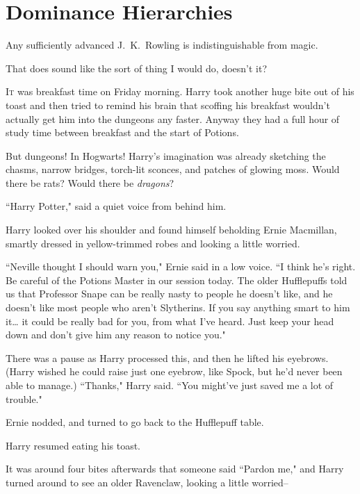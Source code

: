 \chapter{Dominance Hierarchies}

\begin{chapterOpeningAuthorNote}
Any sufficiently advanced J.~K.~Rowling is indistinguishable from magic.
\end{chapterOpeningAuthorNote}
\begin{chapterOpeningQuote}
That does sound like the sort of thing I would do, doesn't it?
\end{chapterOpeningQuote}

\lettrine{I}{t} was breakfast time on Friday morning. Harry took another huge bite out of his toast and then tried to remind his brain that scoffing his breakfast wouldn't actually get him into the dungeons any faster. Anyway they had a full hour of study time between breakfast and the start of Potions.

But dungeons! In Hogwarts! Harry's imagination was already sketching the chasms, narrow bridges, torch-lit sconces, and patches of glowing moss. Would there be rats? Would there be \emph{dragons}?

``Harry Potter," said a quiet voice from behind him.

Harry looked over his shoulder and found himself beholding Ernie Macmillan, smartly dressed in yellow-trimmed robes and looking a little worried.

``Neville thought I should warn you," Ernie said in a low voice. ``I think he's right. Be careful of the Potions Master in our session today. The older Hufflepuffs told us that Professor Snape can be really nasty to people he doesn't like, and he doesn't like most people who aren't Slytherins. If you say anything smart to him it{\ldots} it could be really bad for you, from what I've heard. Just keep your head down and don't give him any reason to notice you."

There was a pause as Harry processed this, and then he lifted his eyebrows. (Harry wished he could raise just one eyebrow, like Spock, but he'd never been able to manage.) ``Thanks," Harry said. ``You might've just saved me a lot of trouble."

Ernie nodded, and turned to go back to the Hufflepuff table.

Harry resumed eating his toast.

It was around four bites afterwards that someone said ``Pardon me," and Harry turned around to see an older Ravenclaw, looking a little worried\---

